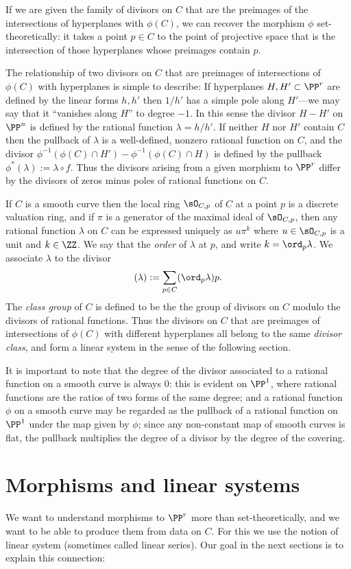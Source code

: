 If we are given the family of divisors on $C$ that are the preimages of the intersections of hyperplanes with  $\phi(C)$, we can recover the morphism $\phi$ set-theoretically: it takes a point $p\in C$ to the point of projective space that is the intersection of those
hyperplanes whose preimages contain $p$. 

The relationship of two divisors on $C$ that are preimages of intersections of $\phi(C)$ with hyperplanes is simple to describe: If hyperplanes
$H, H'\subset \PP^r$ are defined by the linear forms $h, h'$  then $1/h'$ has a simple pole along $H'$---we may say that it ``vanishes along $H$'' to degree $-1$.
In this sense the divisor $H-H'$ on $\PP^n$ is defined by the rational function $\lambda= h/h'$. If neither $H$ nor $H'$ contain $C$ then the pullback of $\lambda$ is a well-defined, nonzero rational function on $C$, and the divisor 
$\phi^{-1}(\phi(C)\cap H') - \phi^{-1}(\phi(C)\cap H)$ is defined by the pullback  $\phi^*(\lambda) := \lambda \circ f$. Thus the divisors arising from a given morphism to $\PP^{r}$ differ by the divisors of zeros minus poles of rational functions on $C$. 


If $C$ is a smooth curve then the local ring $\sO_{C,p}$ of $C$ at a point $p$ is a discrete valuation ring, and if $\pi$ is a generator of the maximal ideal of $\sO_{C,p}$, then any rational
function $\lambda$ on $C$ can be expressed uniquely as $u\pi^k$ where $u\in \sO_{C,p}$ is a unit and $k\in \ZZ$. We say that
the \emph{order} of $\lambda$ at $p$, and write $k = \ord_p \lambda$. We associate $\lambda$ to the divisor
$$
(\lambda) := \sum_{p\in C} (\ord_p\lambda)p.
$$
The \emph{class group} of $C$ is defined to be the the group of divisors on $C$ modulo the divisors of rational functions.
Thus the divisors on $C$ that are preimages of intersections of $\phi(C)$ with different hyperplanes all belong to the same
\emph{divisor class}, and form a linear system in the sense of the following section.

It is important to note that the degree of the divisor associated to a rational function on a smooth curve is always 0: this is evident on $\PP^1$, where rational 
functions are the ratios of two forms of the same degree; and a rational function $\phi$ on a smooth curve may be regarded as the pullback of a rational function
on $\PP^1$ under the map given by $\phi$; since any non-constant map of smooth curves is flat, the pullback multiplies the degree of a divisor by the degree 
of the covering. 

\section{Morphisms and linear systems}
We want to understand morphisms to $\PP^r$ more than set-theoretically, and we want to be able to produce them from data on $C$. For this we use the notion of linear system (sometimes called linear series). Our goal in the next sections is to explain this connection:


